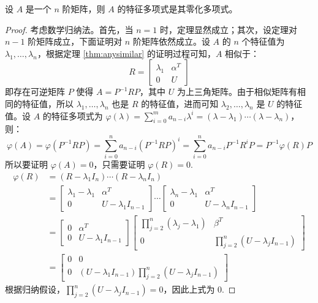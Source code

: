 \begin{theorem}
\label{thm:Hamilton-Cayley}
设 $A$ 是一个 $n$ 阶矩阵，则 $A$ 的特征多项式是其零化多项式。
\end{theorem}

\begin{proof}
考虑数学归纳法。首先，当 $n=1$ 时，定理显然成立；其次，设定理对 $n-1$ 阶矩阵成立，下面证明对 $n$ 阶矩阵依然成立。设 $A$ 的 $n$ 个特征值为 $\lambda_1,\ldots,\lambda_n$，根据定理 \ref{thm:anysimilar} 的证明过程可知，$A$ 相似于：
\[R=\begin{bmatrix}\lambda_1&\alpha^T\\0&U\end{bmatrix}\]
即存在可逆矩阵 $P$ 使得 $A=P^{-1}RP$，其中 $U$ 为上三角矩阵。由于相似矩阵有相同的特征值，所以 $\lambda_1,\ldots,\lambda_n$ 也是 $R$ 的特征值，进而可知 $\lambda_2,\ldots,\lambda_n$ 是 $U$ 的特征值。设 $A$ 的特征多项式为 $\varphi(\lambda)=\sum_{i=0}^ma_{n-i}\lambda^i=(\lambda-\lambda_1)\cdots(\lambda-\lambda_n)$，则：
\[
    \varphi(A)=\varphi(P^{-1}RP)=\sum_{i=0}^n a_{n-i}(P^{-1}RP)^i=\sum_{i=0}^n a_{n-i}P^{-1}R^iP=P^{-1}\varphi(R)P
\]
所以要证明 $\varphi(A)=0$，只需要证明 $\varphi(R)=0$.
\begin{align*}
    \varphi(R)&=(R-\lambda_1I_n)\cdots(R-\lambda_n I_n)\\
    &=\begin{bmatrix}\lambda_1-\lambda_1&\alpha^T\\0&U-\lambda_1I_{n-1}\end{bmatrix}\cdots\begin{bmatrix}\lambda_n-\lambda_1&\alpha^T\\0&U-\lambda_nI_{n-1}\end{bmatrix}\\
    &=\begin{bmatrix}0&\alpha^T\\0&U-\lambda_1I_{n-1}\end{bmatrix}\begin{bmatrix}\prod_{j=2}^n(\lambda_j-\lambda_1)&\beta^T\\0&\prod_{j=2}^n(U-\lambda_jI_{n-1})\end{bmatrix}\\
    &=\begin{bmatrix}0&0\\0&(U-\lambda_1 I_{n-1})\prod_{j=2}^n(U-\lambda_jI_{n-1})\end{bmatrix}
\end{align*}
根据归纳假设，$\prod_{j=2}^n(U-\lambda_jI_{n-1})=0$，因此上式为 $0$.
\end{proof}

